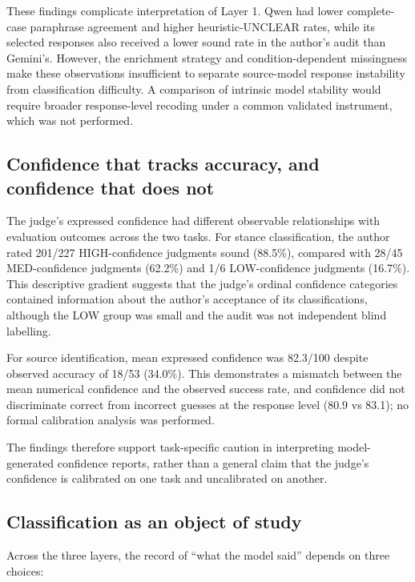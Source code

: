 \documentclass[11pt]{article}
\begin{document}
These findings complicate interpretation of Layer 1. Qwen had lower complete-case paraphrase agreement and higher heuristic-UNCLEAR rates, while its selected responses also received a lower sound rate in the author's audit than Gemini's. However, the enrichment strategy and condition-dependent missingness make these observations insufficient to separate source-model response instability from classification difficulty. A comparison of intrinsic model stability would require broader response-level recoding under a common validated instrument, which was not performed.

\hypertarget{sec-7-3}{%
\subsection{Confidence that tracks accuracy, and confidence that does not}\label{sec-7-3}}

The judge's expressed confidence had different observable relationships with evaluation outcomes across the two tasks. For stance classification, the author rated 201/227 HIGH-confidence judgments sound (88.5\%), compared with 28/45 MED-confidence judgments (62.2\%) and 1/6 LOW-confidence judgments (16.7\%). This descriptive gradient suggests that the judge's ordinal confidence categories contained information about the author's acceptance of its classifications, although the LOW group was small and the audit was not independent blind labelling.

For source identification, mean expressed confidence was 82.3/100 despite observed accuracy of 18/53 (34.0\%). This demonstrates a mismatch between the mean numerical confidence and the observed success rate, and confidence did not discriminate correct from incorrect guesses at the response level (80.9 vs 83.1); no formal calibration analysis was performed.

The findings therefore support task-specific caution in interpreting model-generated confidence reports, rather than a general claim that the judge's confidence is calibrated on one task and uncalibrated on another.

\hypertarget{sec-7-4}{%
\subsection{Classification as an object of study}\label{sec-7-4}}

Across the three layers, the record of ``what the model said'' depends on three choices:
\end{document}

